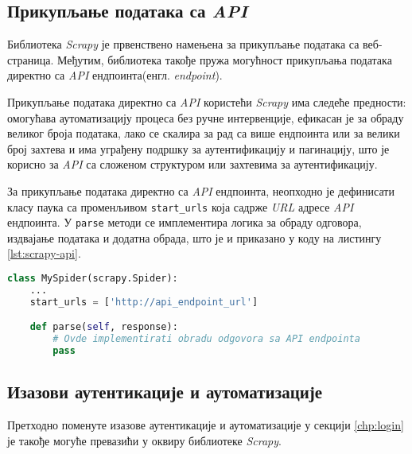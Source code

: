 \documentclass[12pt,oneside]{memoir}
\begin{document}
\subsection{Прикупљање података са \textit{API}}
Библиотека \textit{Scrapy} је првенствено намењена за прикупљање података са веб-страница. Међутим, библиотека такође пружа могућност прикупљања података директно са \textit{API} ендпоинта(енгл. \textit{endpoint}).

Прикупљање података директно са \textit{API} користећи \textit{Scrapy} има следеће предности: омогућава аутоматизацију процеса без ручне интервенције, ефикасан је за обраду великог броја података, лако се скалира за рад са више ендпоинта или за велики број захтева и има уграђену подршку за аутентификацију и пагинацију, што је корисно за \textit{API} са сложеном структуром или захтевима за аутентификацију.

За прикупљање података директно са \textit{API} ендпоинта, неопходно је дефинисати класу паука са променљивом \texttt{start\_urls} која садрже \textit{URL} адресе \textit{API} ендпоинта. У \texttt{parse} методи се имплементира логика за обраду одговора, издвајање података и додатна обрада, што је и приказано у коду на листингу \ref{lst:scrapy-api}.

\begin{lstlisting}[language=Python, caption={Прикупљање података директно са \textit{API}}, label={lst:scrapy-api}]
class MySpider(scrapy.Spider):
    ...
    start_urls = ['http://api_endpoint_url']

    def parse(self, response):
        # Ovde implementirati obradu odgovora sa API endpointa
        pass
\end{lstlisting}

\subsection{Изазови аутентикације и аутоматизације}
Претходно поменуте изазове аутентикације и аутоматизације у секцији \ref{chp:login} је такође могуће превазићи у оквиру библиотеке \textit{Scrapy}.
\end{document}
